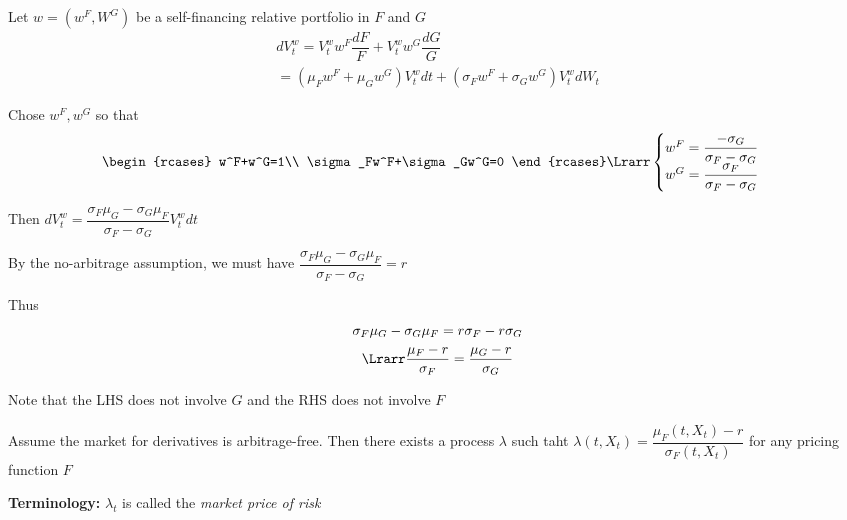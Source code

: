 \noindent Let $w = (w^F,W^G)$ be a self-financing relative portfolio in $F$ and $G$
\begin{equation*}
  \begin{gathered}
    dV_t^w = V_t^ww^F\dfrac{dF}{F}+V_t^ww^G\dfrac{dG}{G}\\
    =\left(\mu_Fw^F+\mu_Gw^G\right)V_t^wdt+\left(\sigma_Fw^F+\sigma_Gw^G\right)V_t^wdW_t
  \end{gathered}
\end{equation*}\par
\noindent Chose $w^F,w^G$ so that 
\begin{equation*}
  \begin{gathered}
    \begin{rcases}
      w^F+w^G=1\\
      \sigma_Fw^F+\sigma_Gw^G=0
      \end{rcases}\Lrarr\begin{cases}
      w^F =\dfrac{-\sigma_G}{\sigma_F-\sigma_G}\\
      w^G = \dfrac{\sigma_F}{\sigma_F-\sigma_G}
    \end{cases}
  \end{gathered}
\end{equation*}\par
\noindent Then $dV_t^w = \dfrac{\sigma_F\mu_G-\sigma_G\mu_F}{\sigma_F-\sigma_G}V_t^wdt$\par
\noindent By the no-arbitrage assumption, we must have $\dfrac{\sigma_F\mu_G-\sigma_G\mu_F}{\sigma_F-\sigma_G} = r$\par
\noindent Thus
\begin{equation*}
  \begin{gathered}
    \sigma_F\mu_G -\sigma_G\mu_F = r\sigma_F-r\sigma_G\\
    \Lrarr \dfrac{\mu_F-r}{\sigma_F} = \dfrac{\mu_G-r}{\sigma_G}
  \end{gathered}
\end{equation*}\par
\noindent Note that the LHS does not involve $G$ and the RHS does not involve $F$
\par\bigskip
\begin{lem}[]{}
  Assume the market for derivatives is arbitrage-free. Then there exists a process $\lambda$ such taht $\lambda(t,X_t) = \dfrac{\mu_F(t,X_t)-r}{\sigma_F(t,X_t)}$ for any pricing function $F$
\end{lem}
\par\bigskip
\noindent\textbf{Terminology:} $\lambda_t$ is called the \textit{market price of risk}
